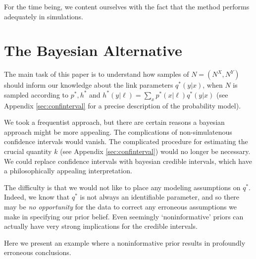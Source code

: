\begin{itemize}
For the time being, we content ourselves with the fact that the method performs adequately in simulations.    

\section{The Bayesian Alternative}


\label{sec:bayesian}

The main task of this paper is to understand how samples of $N=(N^X,N^Y)$ should inform our knowledge about the link parameters $q^*(y|x)$, when $N$ is sampled according to $p^*,h^*$ and $h^*(y|\ell)=\sum_x p^*(x|\ell)q^*(y|x)$ (see Appendix \ref{sec:confinterval} for a precise description of the probability model).  

We took a frequentist approach, but there are certain reasons a bayesian approach might be more appealing.  The complications of non-simulatenous confidence intervals would vanish.  The complicated procedure for estimating the crucial quantity $k$ (see Appendix \ref{sec:confinterval}) would no longer be necessary.  We could replace confidence intervals with bayesian credible intervals, which have a philosophically appealing interpretation.

The difficulty is that we would not like to place any modeling assumptions on $q^*$.  Indeed, we know that $q^*$ is not always an identifiable parameter, and so there may be \emph{no opportunity} for the data to correct any erroneous assumptions we make in specifying our prior belief.   Even seemingly `noninformative' priors can actually have very strong implications for the credible intervals.  

Here we present an example where a noninformative prior results in profoundly erroneous conclusions.  


\end{itemize}
